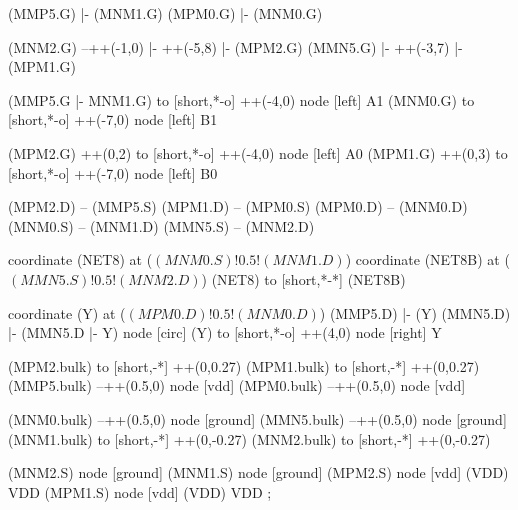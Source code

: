 \begin{circuitikz}[american]
	(MMP5.G) |- (MNM1.G)
	(MPM0.G) |- (MNM0.G)
	
	(MNM2.G) --++(-1,0) |- ++(-5,8) |- (MPM2.G)
	(MMN5.G) |- ++(-3,7) |- (MPM1.G)
	
	(MMP5.G |- MNM1.G) to [short,*-o] ++(-4,0) node [left] {A1}
	(MNM0.G) to [short,*-o] ++(-7,0) node [left] {B1}
	
	(MPM2.G) ++(0,2) to [short,*-o] ++(-4,0) node [left] {A0}
	(MPM1.G) ++(0,3) to [short,*-o] ++(-7,0) node [left] {B0}
	
	(MPM2.D) -- (MMP5.S)
	(MPM1.D) -- (MPM0.S)
	(MPM0.D) -- (MNM0.D)
	(MNM0.S) -- (MNM1.D)
	(MMN5.S) -- (MNM2.D)
	
	coordinate (NET8) at ($(MNM0.S)!0.5!(MNM1.D)$)
	coordinate (NET8B) at ($(MMN5.S)!0.5!(MNM2.D)$)
	(NET8) to [short,*-*] (NET8B)
	
	coordinate (Y) at ($(MPM0.D)!0.5!(MNM0.D)$)
	(MMP5.D) |- (Y)
	(MMN5.D) |- (MMN5.D |- Y) node [circ] {}
	(Y) to [short,*-o] ++(4,0) node [right] {Y}
	
	(MPM2.bulk) to [short,-*] ++(0,0.27)
	(MPM1.bulk) to [short,-*] ++(0,0.27)
	(MMP5.bulk) --++(0.5,0) node [vdd]{}
	(MPM0.bulk) --++(0.5,0) node [vdd]{}
	
	(MNM0.bulk) --++(0.5,0) node [ground]{}
	(MMN5.bulk) --++(0.5,0) node [ground]{}
	(MNM1.bulk) to [short,-*] ++(0,-0.27)	
	(MNM2.bulk) to [short,-*] ++(0,-0.27)


	(MNM2.S) node [ground] {}
	(MNM1.S) node [ground] {}
	(MPM2.S) node [vdd] (VDD) {VDD}
	(MPM1.S) node [vdd] (VDD) {VDD}
;

\end{circuitikz}

